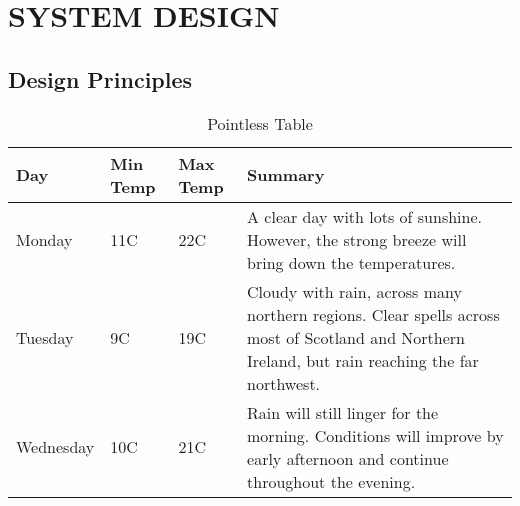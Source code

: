 
\chapter{SYSTEM DESIGN} %

\section{Design Principles}
\lipsum[1-2]
\begin{table}
\centering
    \begin{tabular}{ | l | l | l | p{6cm} |}
    \hline
    Day & Min Temp & Max Temp & Summary \\ \hline
    Monday & 11C & 22C & A clear day with lots of sunshine.  
    However, the strong breeze will bring down the temperatures. \\ \hline
    Tuesday & 9C & 19C & Cloudy with rain, across many northern regions. Clear spells
    across most of Scotland and Northern Ireland,
    but rain reaching the far northwest. \\ \hline
    Wednesday & 10C & 21C & Rain will still linger for the morning.
    Conditions will improve by early afternoon and continue
    throughout the evening. \\
    \hline
    \end{tabular}
\caption{Pointless Table}
\label{PT}
\end{table}
\lipsum[1-2]


